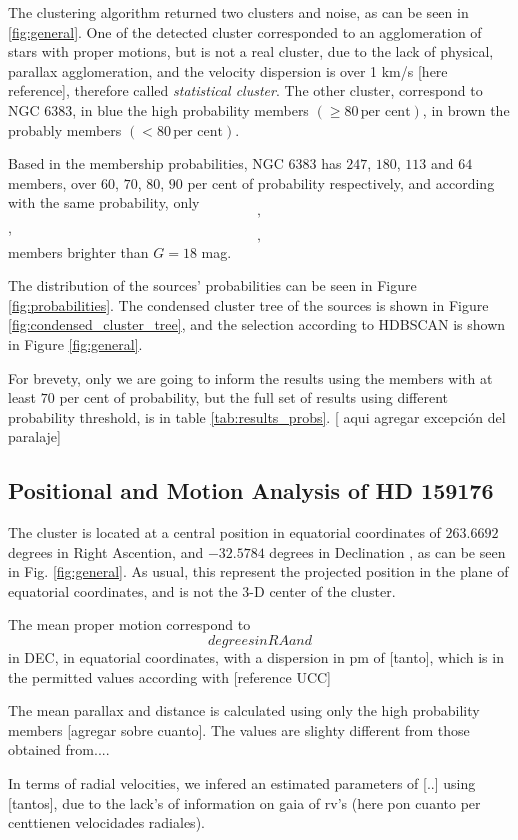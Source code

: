 \documentclass[fleqn,usenatbib,usedcolumn,useAMS]{mnras}
\begin{document}
The clustering algorithm returned two clusters and noise, as can be seen in \ref{fig:general}. One of the detected cluster corresponded to an agglomeration of stars with  proper motions, but is not a real cluster, due to the lack of physical, parallax agglomeration, and the velocity dispersion is over 1 km/s [here reference], therefore called \textit{statistical cluster}. The other cluster, correspond to NGC 6383, in blue the high probability members $(\geq 80\,\text{per cent})$, in brown the probably members $(< 80\,\textrm{per cent})$.

Based in the membership probabilities, NGC 6383 has $247$, $180$, $113$ and $64$ members, over $60$, $70$, $80$, $90$ per cent of probability respectively, and according with the same probability, only $$, $$, $$, $$ members brighter than $G= 18$ mag.

The distribution of the sources' probabilities can be seen in Figure \ref{fig:probabilities}. The condensed cluster tree of the sources is shown in Figure \ref{fig:condensed_cluster_tree}, and the selection according to HDBSCAN is shown in Figure \ref{fig:general}.

For brevety, only we are going to inform the results using the members with at least $70$ per cent of probability, but the full set of results using different probability threshold, is in table \ref{tab:results_probs}. [ aqui agregar excepción del paralaje]

\subsection{Positional and Motion Analysis of HD 159176}

The cluster is located at a central position in equatorial coordinates of $263.6692$ degrees in Right Ascention, and $-32.5784$ degrees in Declination , as can be seen in Fig. \ref{fig:general}. As usual, this represent the projected position in the plane of equatorial coordinates, and is not the 3-D center of the cluster.

The mean proper motion correspond to $$ degrees in RA and $$ in DEC, in equatorial coordinates, with a dispersion in pm of [tanto], which is in the permitted values according with [reference UCC]

The mean parallax and distance is calculated using only the high probability members [agregar sobre cuanto]. The values are slighty different from those obtained from.... 

In terms of radial velocities, we infered an estimated parameters of [..] using [tantos], due to the lack's of information on gaia of rv's (here pon cuanto per centtienen velocidades radiales).
\end{document}
